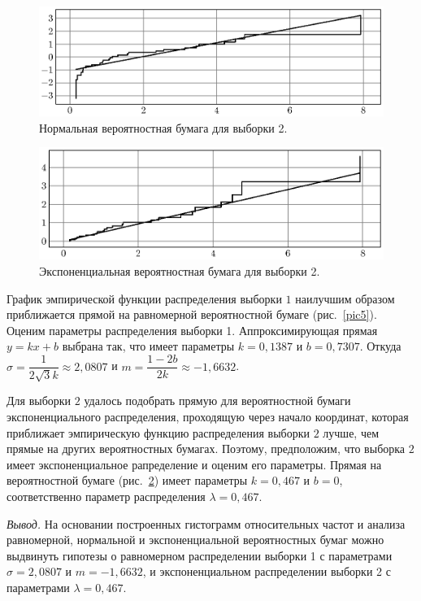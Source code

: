 \begin{figure}[h]
  \includegraphics[scale=1]{images/st.8.eps}
  \caption{Нормальная вероятностная бумага для выборки 2.}\label{pic9}
\end{figure}

\begin{figure}[h]
  \includegraphics[scale=1]{images/st.9.eps}
  \caption{Экспоненциальная вероятностная бумага для выборки 2.}\label{pic10}
\end{figure}



\par

  
  
  
  График эмпирической функции распределения выборки $1$ наилучшим образом 
  приближается прямой на равномерной вероятностной бумаге (рис.~\ref{pic5}).
  Оценим параметры распределения выборки 1. Аппроксимирующая прямая $y = kx + b$ 
  выбрана так, что имеет параметры $k = 0{,}1387$ и 
  $b = 0{,}7307$.
  Откуда $\sigma = \dfrac{1}{2\sqrt{3}k} \approx 
  2{,}0807$ и 
  $m = \dfrac{1 - 2b}{2k} \approx -1{,}6632$.


\par

  
  
  
  Для выборки $2$ удалось подобрать прямую для вероятностной бумаги 
  экспоненциального распределения, проходящую через начало координат, 
  которая приближает эмпирическую функцию распределения выборки $2$ лучше, 
  чем прямые на других вероятностных бумагах. Поэтому, предположим, 
  что выборка $2$ имеет экспоненциальное рапределение и оценим его параметры.
  Прямая на вероятностной бумаге (рис.~\ref{pic10}) имеет параметры 
  $k = 0{,}467$ и $b = 0$, соответственно 
  параметр распределения $\lambda = 0{,}467$.



\newpage



\par
{\em Вывод.} На основании построенных гистограмм относительных частот и анализа 
равномерной, нормальной и экспоненциальной вероятностных бумаг можно выдвинуть 
гипотезы о равномерном распределении выборки 1 с параметрами 
$\sigma = 2{,}0807$ и 
                      $m = -1{,}6632$, и экспоненциальном распределении выборки 2 
с параметрами $\lambda = 0{,}467$. 

\endinput
